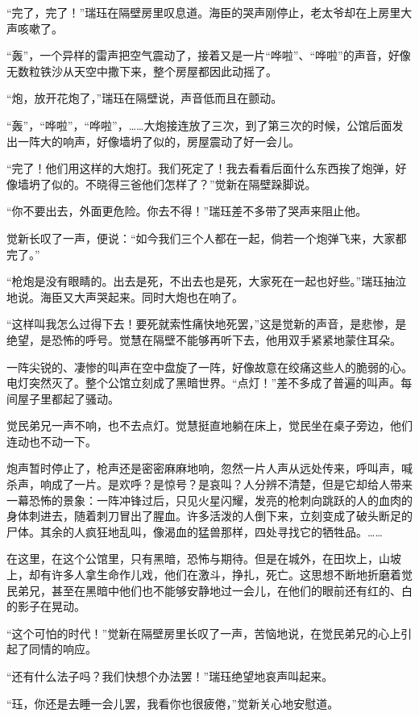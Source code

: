 \par “完了，完了！”瑞珏在隔壁房里叹息道。海臣的哭声刚停止，老太爷却在上房里大声咳嗽了。
\par “轰”，一个异样的雷声把空气震动了，接着又是一片“哗啦”、“哗啦”的声音，好像无数粒铁沙从天空中撒下来，整个房屋都因此动摇了。
\par “炮，放开花炮了，”瑞珏在隔壁说，声音低而且在颤动。
\par “轰”，“哗啦”，“哗啦”，……大炮接连放了三次，到了第三次的时候，公馆后面发出一阵大的响声，好像墙坍了似的，房屋震动了好一会儿。
\par “完了！他们用这样的大炮打。我们死定了！我去看看后面什么东西挨了炮弹，好像墙坍了似的。不晓得三爸他们怎样了？”觉新在隔壁跺脚说。
\par “你不要出去，外面更危险。你去不得！”瑞珏差不多带了哭声来阻止他。
\par 觉新长叹了一声，便说：“如今我们三个人都在一起，倘若一个炮弹飞来，大家都完了。”
\par “枪炮是没有眼睛的。出去是死，不出去也是死，大家死在一起也好些。”瑞珏抽泣地说。海臣又大声哭起来。同时大炮也在响了。
\par “这样叫我怎么过得下去！要死就索性痛快地死罢，”这是觉新的声音，是悲惨，是绝望，是恐怖的呼号。觉慧在隔壁不能够再听下去，他用双手紧紧地蒙住耳朵。
\par 一阵尖锐的、凄惨的叫声在空中盘旋了一阵，好像故意在绞痛这些人的脆弱的心。电灯突然灭了。整个公馆立刻成了黑暗世界。“点灯！”差不多成了普遍的叫声。每间屋子里都起了骚动。
\par 觉民弟兄一声不响，也不去点灯。觉慧挺直地躺在床上，觉民坐在桌子旁边，他们连动也不动一下。
\par 炮声暂时停止了，枪声还是密密麻麻地响，忽然一片人声从远处传来，呼叫声，喊杀声，响成了一片。是欢呼？是惊号？是哀叫？人分辨不清楚，但是它却给人带来一幕恐怖的景象：一阵冲锋过后，只见火星闪耀，发亮的枪刺向跳跃的人的血肉的身体刺进去，随着刺刀冒出了腥血。许多活泼的人倒下来，立刻变成了破头断足的尸体。其余的人疯狂地乱叫，像渴血的猛兽那样，四处寻找它的牺牲品。……
\par 在这里，在这个公馆里，只有黑暗，恐怖与期待。但是在城外，在田坎上，山坡上，却有许多人拿生命作儿戏，他们在激斗，挣扎，死亡。这思想不断地折磨着觉民弟兄，甚至在黑暗中他们也不能够安静地过一会儿，在他们的眼前还有红的、白的影子在晃动。
\par “这个可怕的时代！”觉新在隔壁房里长叹了一声，苦恼地说，在觉民弟兄的心上引起了同情的响应。
\par “还有什么法子吗？我们快想个办法罢！”瑞珏绝望地哀声叫起来。
\par “珏，你还是去睡一会儿罢，我看你也很疲倦，”觉新关心地安慰道。
